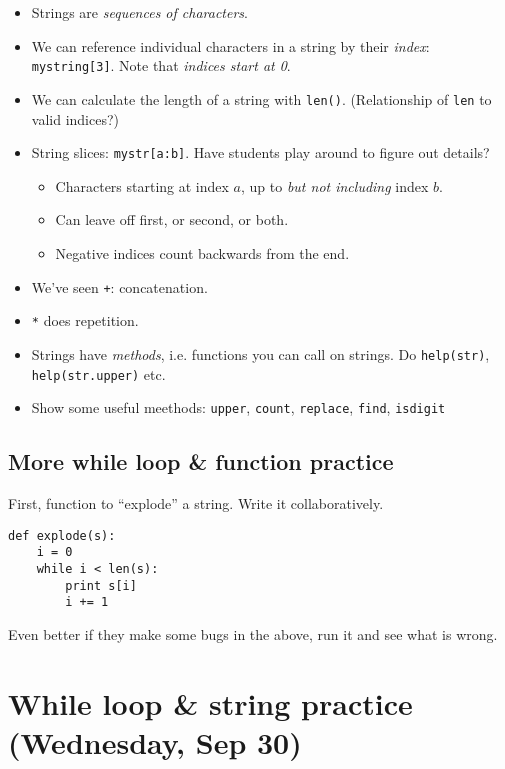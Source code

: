 \documentclass{article}
\begin{document}
\begin{itemize}
\item Strings are \emph{sequences of characters}.

\item We can reference individual characters in a string by their
  \emph{index}: \verb|mystring[3]|.  Note that \emph{indices start at 0}.

\item We can calculate the length of a string with \verb|len()|.
  (Relationship of \verb|len| to valid indices?)

\item String slices: \verb|mystr[a:b]|.  Have students play around to
  figure out details?
  \begin{itemize}
  \item Characters starting at index $a$, up to \emph{but not
      including} index $b$.
  \item Can leave off first, or second, or both.
  \item Negative indices count backwards from the end.
  \end{itemize}

\item We've seen \verb|+|: concatenation.
\item \verb|*| does repetition.

\item Strings have \emph{methods}, i.e. functions you can call on
  strings.  Do \verb|help(str)|, \verb|help(str.upper)| etc.
\item Show some useful meethods: \verb|upper|, \verb|count|,
  \verb|replace|, \verb|find|, \verb|isdigit|
\end{itemize}

\subsection{More while loop \& function practice}

First, function to ``explode'' a string.  Write it collaboratively.

\begin{verbatim}
def explode(s):
    i = 0
    while i < len(s):
        print s[i]
        i += 1
\end{verbatim}

Even better if they make some bugs in the above, run it and see what
is wrong.

\section*{While loop \& string practice (Wednesday, Sep 30)}
\end{document}
